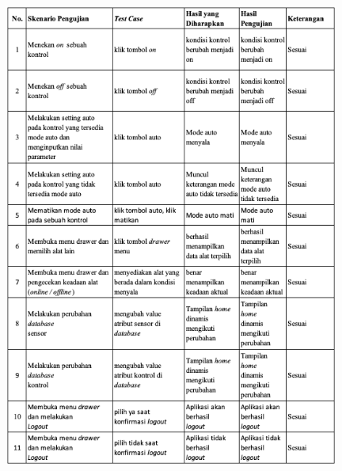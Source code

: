 \begin{flushleft}
\begin{justify}
\begin{itemize}
\begin{table}[ht]
                    \includegraphics[width=11cm]{images/bab 4/fungsional-home.png}\\
                    \end{table}
            \end{itemize}
           

\end{justify}
\end{flushleft}
